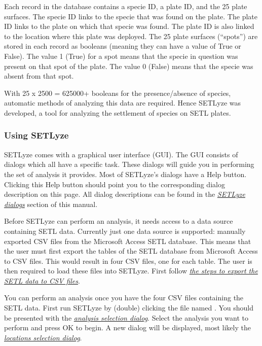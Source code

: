 \documentclass[letterpaper,10pt,english]{sphinxmanual}
\begin{document}
Each record in the database contains a specie ID, a plate ID, and
the 25 plate surfaces. The specie ID links to the specie that was found
on the plate. The plate ID links to the plate on which that specie was
found. The plate ID is also linked to the location where this plate
was deployed. The 25 plate surfaces (``spots'') are stored in each record
as booleans (meaning they can have a value of True or False). The value
1 (True) for a spot means that the specie in question was present on
that spot of the plate. The value 0 (False) means that the specie
was absent from that spot.

With 25 x 2500 = 625000+ booleans for the presence/absence of species,
automatic methods of analyzing this data are required. Hence SETLyze
was developed, a tool for analyzing the settlement of species
on SETL plates.


\subsubsection{Using SETLyze}
\label{user_manual:using-setlyze}
SETLyze comes with a graphical user interface (GUI). The GUI consists
of dialogs which all have a specific task. These dialogs will guide
you in performing the set of analysis it provides. Most of SETLyze's
dialogs have a Help button. Clicking this Help button should point you
to the corresponding dialog description on this page. All dialog
descriptions can be found in the {\hyperref[user_manual:setlyze-dialogs]{\emph{SETLyze dialogs}}}
section of this manual.

Before SETLyze can perform an analysis, it needs access to a data
source containing SETL data. Currently just one data source is
supported: manually exported CSV files from the Microsoft Access SETL
database. This means that the user must first export the tables of the
SETL database from Microsoft Access to CSV files. This would result in
four CSV files, one for each table. The user is then required to load
these files into SETLyze. First follow {\hyperref[user_manual:export-csv-msaccess]{\emph{the steps to export the
SETL data to CSV files}}}.

You can perform an analysis once you have the four CSV files containing
the SETL data. First run SETLyze by (double) clicking the file named
. You should be presented with the
{\hyperref[user_manual:dialog-analysis-selection]{\emph{analysis selection dialog}}}. Select
the analysis you want to perform and press OK to begin. A new dialog
will be displayed, most likely the
{\hyperref[user_manual:dialog-loc-selection]{\emph{locations selection dialog}}}.
\end{document}
